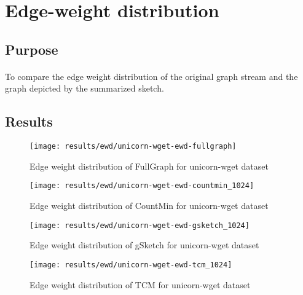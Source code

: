 \section{Edge-weight distribution}

\subsection*{Purpose}

\paragraph{}
To compare the edge weight distribution of the original graph stream and the graph depicted by the summarized sketch.

\subsection*{Results}

\begin{figure}[H]
    \centering \texttt{[image: results/ewd/unicorn-wget-ewd-fullgraph]}
    \vspace{-0.5cm}
    \caption{Edge weight distribution of FullGraph for unicorn-wget dataset}
    \label{fig:unicorn-wget-ewd-fullgraph}
\end{figure}

\begin{figure}[H]
    \centering \texttt{[image: results/ewd/unicorn-wget-ewd-countmin\_1024]}
    \vspace{-0.5cm}
    \caption{Edge weight distribution of CountMin for unicorn-wget dataset}
    \label{fig:unicorn-wget-ewd-countmin_1024}
\end{figure}

\begin{figure}[H]
    \centering \texttt{[image: results/ewd/unicorn-wget-ewd-gsketch\_1024]}
    \vspace{-0.5cm}
    \caption{Edge weight distribution of gSketch for unicorn-wget dataset}
    \label{fig:unicorn-wget-ewd-gsketch_1024}
\end{figure}

\begin{figure}[H]
    \centering \texttt{[image: results/ewd/unicorn-wget-ewd-tcm\_1024]}
    \vspace{-0.5cm}
    \caption{Edge weight distribution of TCM for unicorn-wget dataset}
    \label{fig:unicorn-wget-ewd-tcm_1024}
\end{figure}

